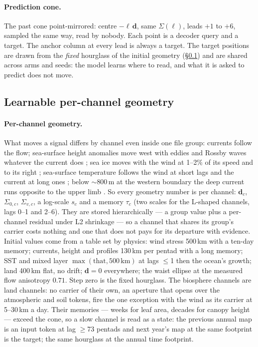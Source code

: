 \documentclass[10pt]{article}
\begin{document}
\paragraph{Prediction cone.} The past cone point-mirrored: centre
$-\ell\,\mathbf{d}$, same $\Sigma(\ell)$, leads $+1$ to $+6$, sampled the
same way, read by nobody. Each point is a decoder query and a target. The
anchor column at every lead is always a target. The target positions are
drawn from the \emph{fixed} hourglass of the initial geometry
(\S\ref{sec:geometry-learn}) and are shared across arms and seeds: the model
learns where to read, and what it is asked to predict does not move.

\subsection{Learnable per-channel geometry}\label{sec:geometry-learn}

\paragraph{Per-channel geometry.} What moves a signal differs by channel
even inside one file group: currents follow the flow; sea-surface height
anomalies move west with eddies and Rossby waves whatever the current does
\cite{chelton}; sea ice moves with the wind at 1--2\% of its speed and to its
right \cite{thorndike}; sea-surface temperature follows the wind at short
lags and the current at long ones \cite{sutton}; below ${\sim}$800\,m at the
western boundary the deep current runs opposite to the upper limb
\cite{meinen}. So every geometry number is per channel: $\mathbf{d}_c$,
$\Sigma_{0,c}$, $\Sigma_{v,c}$, a log-scale $s_c$ and a memory $\tau_c$
(two scales for the L-shaped channels, lags 0--1 and 2--6). They are stored
hierarchically --- a group value plus a per-channel residual under L2
shrinkage --- so a channel that shares its group's carrier costs nothing and
one that does not pays for its departure with evidence. Initial values come
from a table set by physics: wind stress 500\,km with a ten-day memory;
currents, height and profiles 130\,km per pentad with a long memory; SST and
mixed layer $\max(\text{that},500\,\text{km})$ at lags ${\le}$1 then the
ocean's growth; land 400\,km flat, no drift; $\mathbf{d}=0$ everywhere; the
waist ellipse at the measured flow anisotropy $0.71$. Step zero is the fixed
hourglass. The biosphere channels are land channels: no carrier of their
own, an aperture that opens over the atmospheric and soil tokens, fire the
one exception with the wind as its carrier at 5--30\,km a day. Their memories
--- weeks for leaf area, decades for canopy height --- exceed the cone, so a
slow channel is read as a state: the previous annual map is an input token
at lag ${\ge}$73 pentads and next year's map at the same footprint is the
target; the same hourglass at the annual time footprint.
\end{document}
